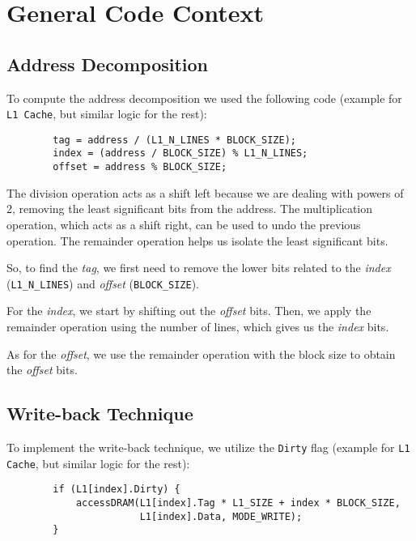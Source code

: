 \documentclass[12pt]{article}
\begin{document}
    \section{General Code Context}

    \subsection{Address Decomposition} \label{AD}
    To compute the address decomposition we used the following code (example for \texttt{L1 Cache}, but similar logic for the rest):

    \begin{verbatim}
        tag = address / (L1_N_LINES * BLOCK_SIZE);
        index = (address / BLOCK_SIZE) % L1_N_LINES;
        offset = address % BLOCK_SIZE;
    \end{verbatim}

    \vskip -0.3cm
    The division operation acts as a shift left because we are dealing with powers of 2, removing the least significant bits from the address.
    The multiplication operation, which acts as a shift right, can be used to undo the previous operation. The remainder operation helps
    us isolate the least significant bits.

    So, to find the \textit{tag}, we first need to remove the lower bits related to the \textit{index} (\texttt{L1\_N\_LINES}) and \textit{offset} (\texttt{BLOCK\_SIZE}).

    For the \textit{index}, we start by shifting out the \textit{offset} bits. Then, we apply the remainder operation using the number of lines,
    which gives us the \textit{index} bits.

    As for the \textit{offset}, we use the remainder operation with the block size to obtain the \textit{offset} bits.

    \subsection{Write-back Technique} \label{WBT}
    To implement the write-back technique, we utilize the \texttt{Dirty} flag (example for \texttt{L1 Cache}, but similar logic for the rest):

    \begin{verbatim}
        if (L1[index].Dirty) {
            accessDRAM(L1[index].Tag * L1_SIZE + index * BLOCK_SIZE,
                       L1[index].Data, MODE_WRITE);
        }
    \end{verbatim}
\end{document}
